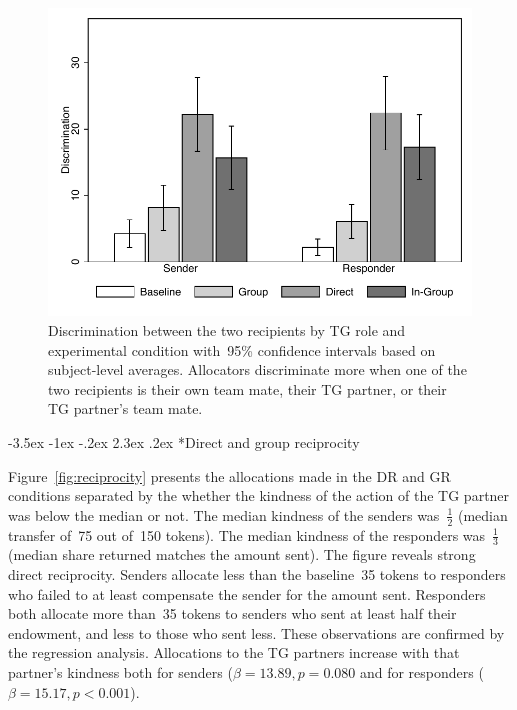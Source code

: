 \documentclass[12pt,a4paper]{article}
\makeatletter
\renewcommand\subsection{\@startsection {subsection}{1}{\z@}%
{-3.5ex \@plus -1ex \@minus -.2ex}%
{2.3ex \@plus.2ex}%
{\it\large}}
\def\figwidth{\textwidth}
\makeatother
\begin{document}
\begin{figure}
\caption{
Discrimination between the two recipients by TG role and experimental condition with~95\% confidence intervals based on subject-level averages. Allocators discriminate more when one of the two recipients is their own team mate, their TG partner, or their TG partner's team mate.
}
\label{fig:discrimination}
\begin{center}
	\includegraphics[width=\figwidth]{Discrimination.pdf}
\end{center}
\end{figure}

\subsection*{Direct and group reciprocity}
\label{sec:reciprocity}

Figure~\ref{fig:reciprocity} presents the allocations made in the DR and GR conditions separated by the whether the kindness of the action of the TG partner was below the median or not. The median kindness of the senders was~$\frac{1}{2}$ (median transfer of~75 out of~150 tokens). The median kindness of the responders was~$\frac{1}{3}$ (median share returned matches the amount sent). The figure reveals strong direct reciprocity. Senders allocate less than the baseline~35 tokens to responders who failed to at least compensate the sender for the amount sent. Responders both allocate more than~35 tokens to senders who sent at least half their endowment, and less to those who sent less.
These observations are confirmed by the regression analysis. Allocations to the TG partners increase with that partner's kindness both for senders ($\beta = 13.89, p=0.080$ and for responders ($\beta = 15.17, p<0.001$).
\end{document}
